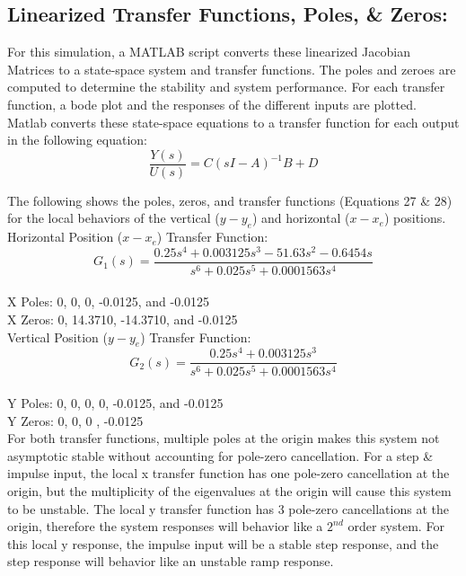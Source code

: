 \documentclass[conference]{IEEEtran}
\begin{document}
\newpage
\subsection{Linearized Transfer Functions, Poles, \& Zeros:}
For this simulation, a MATLAB script converts these linearized Jacobian Matrices to a state-space system and transfer functions. The poles and zeroes are computed to determine the stability and system performance. For each transfer function, a bode plot and the responses of the different inputs are plotted. \\

Matlab converts these state-space equations to a transfer function for each output in the following equation:
\[
 \frac{Y(s)}{U(s)} = C(sI-A)^{-1}B+D \tag{26}
\]

The following shows the poles, zeros, and transfer functions (Equations 27 \& 28) for the local behaviors of the vertical ($y - y_e$) and horizontal ($x - x_e$) positions.\\

Horizontal Position ($x - x_e$) Transfer Function:\\
\[
G_1(s) = \frac{0.25 s^4 + 0.003125 s^3 - 51.63 s^2 - 0.6454 s}{s^6 + 0.025 s^5 + 0.0001563 s^4} \tag{27}
\]
\\
\noindent X Poles: 0, 0, 0, -0.0125, and -0.0125\\
X Zeros: 0, 14.3710, -14.3710, and -0.0125\\

Vertical Position ($y - y_e$) Transfer Function:
\[
G_2(s) = \frac{0.25 s^4 + 0.003125 s^3}{s^6 + 0.025 s^5 + 0.0001563 s^4} \tag{28}
\]
\\
Y Poles: 0, 0, 0, 0, -0.0125, and -0.0125\\
Y Zeros: 0, 0, 0 , -0.0125\\

For both transfer functions, multiple poles at the origin makes this system not asymptotic stable without accounting for pole-zero cancellation. For a step \& impulse input, the local x transfer function has one pole-zero cancellation at the origin, but the multiplicity of the eigenvalues at the origin will cause this system to be unstable. The local y transfer function has 3 pole-zero cancellations at the origin, therefore the system responses will behavior like a $2^{nd}$ order system. For this local y response, the impulse input will be a stable step response, and the step response will behavior like an unstable ramp response. 

\newpage
\end{document}
